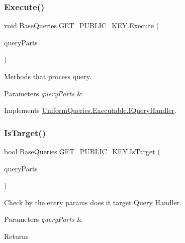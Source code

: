 \subsubsection{\texorpdfstring{Execute()}{Execute()}}
{\footnotesize\ttfamily void Base\+Queries.\+G\+E\+T\+\_\+\+P\+U\+B\+L\+I\+C\+\_\+\+K\+E\+Y.\+Execute (\begin{DoxyParamCaption}\item[{\mbox{\hyperlink{struct_uniform_queries_1_1_query_part}{Query\+Part}} \mbox{[}$\,$\mbox{]}}]{query\+Parts }\end{DoxyParamCaption})}



Methods that process query. 


\begin{DoxyParams}{Parameters}
{\em query\+Parts} & \\
\hline
\end{DoxyParams}


Implements \mbox{\hyperlink{interface_uniform_queries_1_1_executable_1_1_i_query_handler_a3268d72c0388f5e3debba4d73bdfe523}{Uniform\+Queries.\+Executable.\+I\+Query\+Handler}}.

\mbox{\label{class_base_queries_1_1_g_e_t___p_u_b_l_i_c___k_e_y_a15316117d19cd8d85fb90a37bad5e9d7}} 
\subsubsection{\texorpdfstring{Is\+Target()}{IsTarget()}}
{\footnotesize\ttfamily bool Base\+Queries.\+G\+E\+T\+\_\+\+P\+U\+B\+L\+I\+C\+\_\+\+K\+E\+Y.\+Is\+Target (\begin{DoxyParamCaption}\item[{\mbox{\hyperlink{struct_uniform_queries_1_1_query_part}{Query\+Part}} \mbox{[}$\,$\mbox{]}}]{query\+Parts }\end{DoxyParamCaption})}



Check by the entry params does it target Query Handler. 


\begin{DoxyParams}{Parameters}
{\em query\+Parts} & \\
\hline
\end{DoxyParams}
\begin{DoxyReturn}{Returns}

\end{DoxyReturn}


